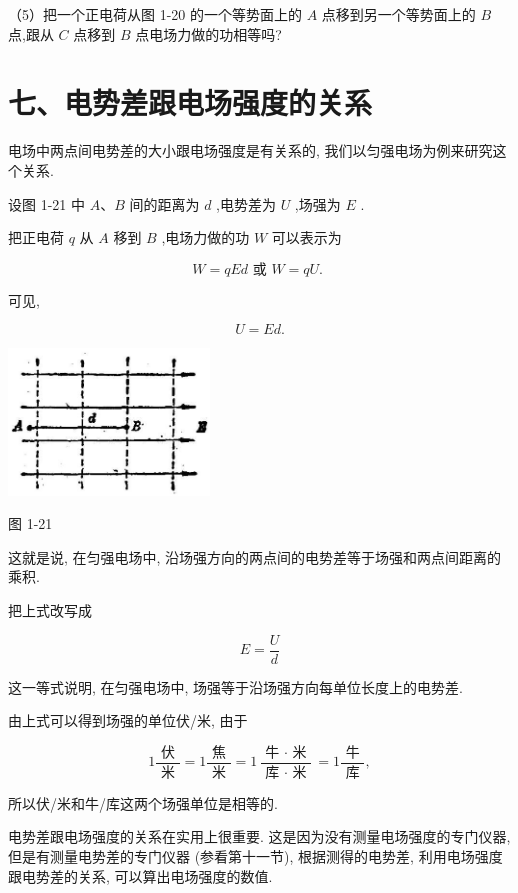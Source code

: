 \documentclass[10pt]{article}
\begin{document}
（5）把一个正电荷从图 1-20 的一个等势面上的 \(A\) 点移到另一个等势面上的 \(B\) 点,跟从 \(C\) 点移到 \(B\) 点电场力做的功相等吗?

\section*{七、电势差跟电场强度的关系}

电场中两点间电势差的大小跟电场强度是有关系的, 我们以匀强电场为例来研究这个关系.

设图 1-21 中 \(A\text{、}B\) 间的距离为 \(d\) ,电势差为 \(U\) ,场强为 \(E\) .

把正电荷 \(q\) 从 \(A\) 移到 \(B\) ,电场力做的功 \(W\) 可以表示为

\[
W = {qEd}\text{ 或 }W = {qU}\text{. }
\]

可见,

\[
U = {Ed}\text{.}
\]

\begin{center}
\includegraphics[max width=0.4\textwidth]{images/01913056-1f15-74d8-9184-9aab52c9d66b_35_473269.jpg}
\end{center}

图 1-21

这就是说, 在匀强电场中, 沿场强方向的两点间的电势差等于场强和两点间距离的乘积.

把上式改写成

\[
E = \frac{U}{d}
\]

这一等式说明, 在匀强电场中, 场强等于沿场强方向每单位长度上的电势差.

由上式可以得到场强的单位伏/米, 由于

\[
1\frac{\text{ 伏 }}{\text{ 米 }} = 1\frac{\text{ 焦 }}{\text{ 米 }} = 1\frac{\text{ 牛 } \cdot \text{ 米 }}{\text{ 库 } \cdot \text{ 米 }} = 1\frac{\text{ 牛 }}{\text{ 库 }},
\]

所以伏/米和牛/库这两个场强单位是相等的.

电势差跟电场强度的关系在实用上很重要. 这是因为没有测量电场强度的专门仪器, 但是有测量电势差的专门仪器 (参看第十一节), 根据测得的电势差, 利用电场强度跟电势差的关系, 可以算出电场强度的数值.
\end{document}
